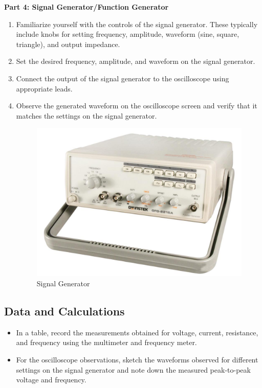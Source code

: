 \noindent \textbf{Part 4: Signal Generator/Function Generator}

\begin{enumerate}
    \item Familiarize yourself with the controls of the signal generator. These typically include knobs for setting frequency, amplitude, waveform (sine, square, triangle), and output impedance.

    \item Set the desired frequency, amplitude, and waveform on the signal generator.

    \item Connect the output of the signal generator to the oscilloscope using appropriate leads.

    \item Observe the generated waveform on the oscilloscope screen and verify that it matches the settings on the signal generator.
    
    \begin{figure}[H]
        \centering
        \includegraphics[width=0.75\linewidth]{img/signal_generator.png}
        \caption{Signal Generator}
        \label{fig:enter-label}
    \end{figure}

\end{enumerate}

\subsection*{Data and Calculations}

\begin{itemize}

    \item In a table, record the measurements obtained for voltage, current, resistance, and frequency using the multimeter and frequency meter.

    \item For the oscilloscope observations, sketch the waveforms observed for different settings on the signal generator and note down the measured peak-to-peak voltage and frequency.

\end{itemize}

